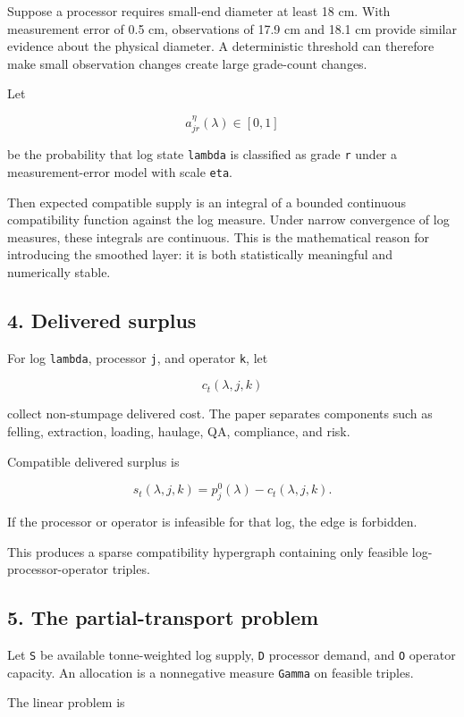 Suppose a processor requires small-end diameter at least 18 cm. With measurement
error of 0.5 cm, observations of 17.9 cm and 18.1 cm provide similar evidence
about the physical diameter. A deterministic threshold can therefore make
small observation changes create large grade-count changes.

Let

\[
a_{jr}^\eta(\lambda)\in[0,1]
\]

be the probability that log state \texttt{lambda} is classified as grade \texttt{r} under a
measurement-error model with scale \texttt{eta}.

Then expected compatible supply is an integral of a bounded continuous
compatibility function against the log measure. Under narrow convergence of log
measures, these integrals are continuous. This is the mathematical reason for
introducing the smoothed layer: it is both statistically meaningful and
numerically stable.

\subsection{4. Delivered surplus}\label{delivered-surplus}

For log \texttt{lambda}, processor \texttt{j}, and operator \texttt{k}, let

\[
c_t(\lambda,j,k)
\]

collect non-stumpage delivered cost. The paper separates components such as
felling, extraction, loading, haulage, QA, compliance, and risk.

Compatible delivered surplus is

\[
s_t(\lambda,j,k)=p_j^0(\lambda)-c_t(\lambda,j,k).
\]

If the processor or operator is infeasible for that log, the edge is forbidden.

This produces a sparse compatibility hypergraph containing only feasible
log-processor-operator triples.

\subsection{5. The partial-transport problem}\label{the-partial-transport-problem}

Let \texttt{S} be available tonne-weighted log supply, \texttt{D} processor demand, and \texttt{O}
operator capacity. An allocation is a nonnegative measure \texttt{Gamma} on feasible
triples.

The linear problem is

